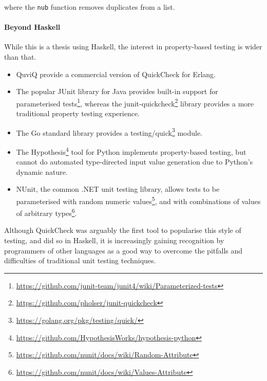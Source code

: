 \noindent where the \verb|nub| function removes duplicates from a
list.

\paragraph{Beyond Haskell}
While this is a thesis using Haskell, the interest in property-based testing is
wider than that.

\begin{itemize}
\item QuviQ provide a commercial version of QuickCheck for
  Erlang\cite{arts2006}.
\item The popular JUnit library for Java provides built-in support for parameterised
  tests\footnote{\url{https://github.com/junit-team/junit4/wiki/Parameterized-tests}},
  whereas the
  junit-quickcheck\footnote{\url{https://github.com/pholser/junit-quickcheck}}
  library provides a more traditional property testing experience.
\item The Go standard library provides a
  testing/quick\footnote{\url{https://golang.org/pkg/testing/quick/}} module.
\item The
  Hypothesis\footnote{\url{https://github.com/HypothesisWorks/hypothesis-python}}
  tool for Python implements property-based testing, but cannot do automated
  type-directed input value generation due to Python's dynamic nature.
\item NUnit, the common .NET unit testing library, allows tests to be
  parameterised with random numeric
  values\footnote{\url{https://github.com/nunit/docs/wiki/Random-Attribute}},
  and with combinations of values of arbitrary
  types\footnote{\url{https://github.com/nunit/docs/wiki/Values-Attribute}}.
\end{itemize}

Although QuickCheck was arguably the first tool to popularise this style of
testing, and did so in Haskell, it is increasingly gaining recognition by
programmers of other languages as a good way to overcome the pitfalls and
difficulties of traditional unit testing techniques.
